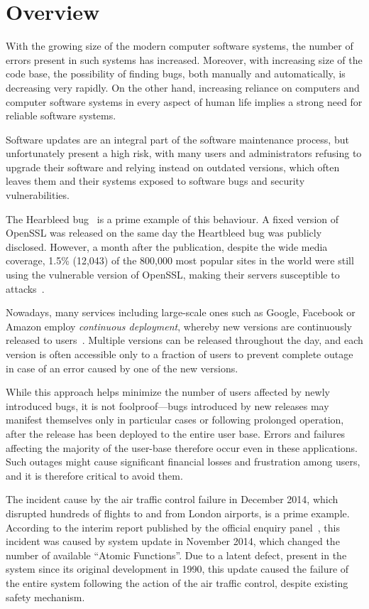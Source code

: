 \chapter{Overview}
\label{chap:overview}

With the growing size of the modern computer software systems, the number of
errors present in such systems has increased.  Moreover, with increasing size
of the code base, the possibility of finding bugs, both manually and
automatically, is decreasing very rapidly. On the other hand, increasing
reliance on computers and computer software systems in every aspect of human
life implies a strong need for reliable software systems.

Software updates are an integral part of the software maintenance process, but
unfortunately present a high risk, with many users and administrators refusing
to upgrade their software and relying instead on outdated versions, which often
leaves them and their systems exposed to software bugs and security
vulnerabilities.

The Hearbleed bug~\cite{heartbleed} is a prime example of this behaviour. A
fixed version of OpenSSL was released on the same day the Heartbleed bug was
publicly disclosed.  However, a month after the publication, despite the wide
media coverage, 1.5\% (12,043) of the 800,000 most popular sites in the world
were still using the vulnerable version of OpenSSL, making their servers
susceptible to attacks~\cite{heartbleed-prevalent}.

Nowadays, many services including large-scale ones such as Google, Facebook or
Amazon employ \emph{continuous deployment}, whereby new versions are
continuously released to users~\cite{johnson2009}. Multiple versions can be
released throughout the day, and each version is often accessible only to a
fraction of users to prevent complete outage in case of an error caused by one
of the new versions.

While this approach helps minimize the number of users affected by newly
introduced bugs, it is not foolproof---bugs introduced by new releases may
manifest themselves only in particular cases or following prolonged operation,
after the release has been deployed to the entire user base. Errors and
failures affecting the majority of the user-base therefore occur even in these
applications. Such outages might cause significant financial losses and
frustration among users, and it is therefore critical to avoid them.

The incident cause by the air traffic control failure in December 2014, which
disrupted hundreds of flights to and from London airports, is a prime example.
According to the interim report published by the official enquiry
panel~\cite{natsfailure}, this incident was caused by system update in November 2014,
which changed the number of available ``Atomic Functions''. Due to a latent
defect, present in the system since its original development in 1990, this
update caused the failure of the entire system following the action of the air
traffic control, despite existing safety mechanism.

